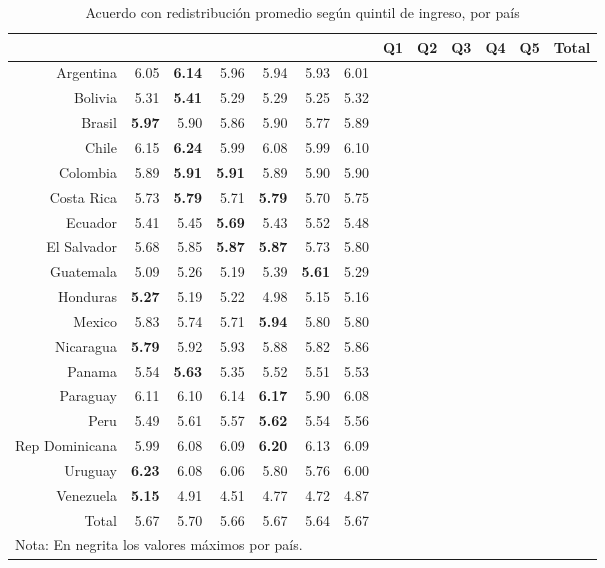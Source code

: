\documentclass[12pt,letterpaper]{article}
\begin{document}
\begin{table}[H]
	\centering
	\begin{center}
	\caption{Acuerdo con redistribución promedio según quintil de ingreso, por país}
	\label{tab2} 
    \renewcommand{\arraystretch}{0.7}
		\begin{tabular} {rrrrrrr}
			\multicolumn{ 7 }{l}{ } \cr 
			\hline
			& \textbf{Q1} & \textbf{Q2} & \textbf{Q3} & \textbf{Q4} & \textbf{Q5} & \textbf{Total} \\ 
			\hline
			Argentina & 6.05 & \textbf{6.14} & 5.96 & 5.94 & 5.93 & 6.01 \\ 
			Bolivia & 5.31 & \textbf{5.41} & 5.29 & 5.29 & 5.25 & 5.32 \\ 
			Brasil & \textbf{5.97} & 5.90 & 5.86 & 5.90 & 5.77 & 5.89 \\ 
			Chile & 6.15 & \textbf{6.24} & 5.99 & 6.08 & 5.99 & 6.10 \\ 
			Colombia & 5.89 & \textbf{5.91} & \textbf{5.91} & 5.89 & 5.90 & 5.90 \\ 
			Costa Rica & 5.73 & \textbf{5.79} & 5.71 & \textbf{5.79} & 5.70 & 5.75 \\ 
			Ecuador & 5.41 & 5.45 & \textbf{5.69} & 5.43 & 5.52 & 5.48 \\ 
			El Salvador & 5.68 & 5.85 & \textbf{5.87} & \textbf{5.87} & 5.73 & 5.80 \\ 
			Guatemala & 5.09 & 5.26 & 5.19 & 5.39 & \textbf{5.61} & 5.29 \\ 
			Honduras & \textbf{5.27} & 5.19 & 5.22 & 4.98 & 5.15 & 5.16 \\ 
			Mexico & 5.83 & 5.74 & 5.71 & \textbf{5.94} & 5.80 & 5.80 \\ 
			Nicaragua & \textbf{5.79} & 5.92 & 5.93 & 5.88 & 5.82 & 5.86 \\ 
			Panama & 5.54 & \textbf{5.63} & 5.35 & 5.52 & 5.51 & 5.53 \\ 
			Paraguay & 6.11 & 6.10 & 6.14 & \textbf{6.17} & 5.90 & 6.08 \\ 
			Peru & 5.49 & 5.61 & 5.57 & \textbf{5.62} & 5.54 & 5.56 \\ 
			Rep Dominicana & 5.99 & 6.08 & 6.09 & \textbf{6.20} & 6.13 & 6.09 \\ 
			Uruguay & \textbf{6.23} & 6.08 & 6.06 & 5.80 & 5.76 & 6.00 \\ 
			Venezuela & \textbf{5.15} & 4.91 & 4.51 & 4.77 & 4.72 & 4.87 \\ 
			\hline
			Total & 5.67 & 5.70 & 5.66 & 5.67 & 5.64 & 5.67 \\
			\hline 
			\multicolumn{7}{l}{\scriptsize{Nota: En negrita los valores máximos por país.}}
		\end{tabular}
	\end{center}
\end{table} 
\end{document}
